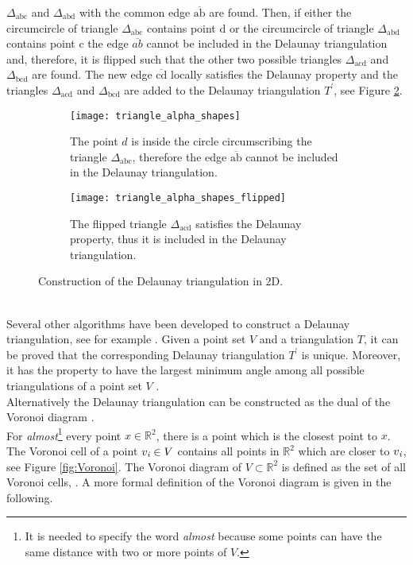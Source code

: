 $\Delta_{\textrm{abc}}$ and $\Delta_{\textrm{abd}}$ with the common edge $\overline{\textrm{ab}}$ are found. Then, if either the circumcircle of triangle $\Delta_{\textrm{abc}}$ contains point \textrm{d} or the circumcircle of triangle $\Delta_{\textrm{abd}}$ contains point \textrm{c} the edge $\overline{ab}$ cannot be included in the Delaunay triangulation and, therefore, it is flipped such that the other two possible triangles $\Delta_{\textrm{acd}}$ and $\Delta_{\textrm{bcd}}$ are found. The new edge $\overline{\textrm{cd}}$ locally satisfies the Delaunay property and the triangles $\Delta_{\textrm{acd}}$ and  $\Delta_{\textrm{bcd}}$ are added to the Delaunay triangulation $T^\prime$, see Figure \ref{fig:Delaunay}.  
\begin{figure}[h]\label{fig:Delaunay}
\begin{subfigure}[t]{0.48\textwidth}
\centering
\texttt{[image: triangle\_alpha\_shapes]}
\label{fig:shape}
\caption{The point $d$ is inside the circle circumscribing the triangle $\Delta_{\textrm{abc}}$, therefore the edge $\overline{\textrm{ab}}$ cannot be included in the Delaunay triangulation.}
\end{subfigure}
\begin{subfigure}[t]{0.48\textwidth}
\centering
\texttt{[image: triangle\_alpha\_shapes\_flipped]}
\caption{The flipped triangle $\Delta_{\textrm{acd}}$ satisfies the Delaunay property, thus it is included in the Delaunay triangulation.}
\end{subfigure}
\caption{Construction of the Delaunay triangulation in 2D.}
\label{fig:Delaunay}
\end{figure}
\\ \indent Several other algorithms have been developed to construct a Delaunay triangulation, see for example \cite{lee1980two, renka1997algorithm}.
 Given a point set $V$ and a triangulation $T$, it can be proved that the corresponding Delaunay triangulation $T^\prime$ is unique. Moreover, it has the property to have the largest minimum angle among all possible triangulations of a point set $V$ \cite{press2007numerical}.
\\ \indent Alternatively the Delaunay triangulation can be constructed as the dual of the Voronoi diagram \cite{fortune1992voronoi}.\\\indent 
 For \textit{almost}\footnote{It is needed to specify the word \textit{almost} because some points can have the same distance with two or more points of $V$.} every point $x\in \mathbb{R}^2$, there is a point which is the closest point to $x$. The Voronoi cell of a point $v_{\textit{i}}\in V$ contains all points in $\mathbb{R}^2$ which are closer to $v_{\textit{i}}$, see Figure \ref{fig:Voronoi}. The Voronoi diagram of $V\subset \mathbb{R}^2$ is defined as the set of all Voronoi cells, \cite{cazals2005conformal}. A more formal definition of the Voronoi diagram is given in the following.
